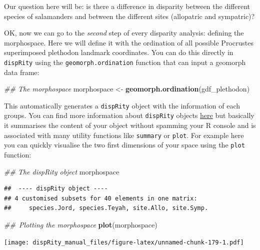 \documentclass[]{book}
\newenvironment{Shaded}{\begin{snugshade}}{\end{snugshade}}
\newcommand{\CommentTok}[1]{\textcolor[rgb]{0.56,0.35,0.01}{\textit{#1}}}
\newcommand{\KeywordTok}[1]{\textcolor[rgb]{0.13,0.29,0.53}{\textbf{#1}}}
\newcommand{\NormalTok}[1]{#1}
\newcommand{\StringTok}[1]{\textcolor[rgb]{0.31,0.60,0.02}{#1}}
\begin{document}
Our question here will be: is there a difference in disparity between the different species of salamanders and between the different sites (allopatric and sympatric)?

OK, now we can go to the \emph{second} step of every disparity analysis: defining the morphospace.
Here we will define it with the ordination of all possible Procrustes superimposed plethodon landmark coordinates.
You can do this directly in \texttt{dispRity} using the \texttt{geomorph.ordination} function that can input a geomorph data frame:

\begin{Shaded}
\begin{Highlighting}[]
\CommentTok{## The morphospace}
\NormalTok{morphospace <-}\StringTok{ }\KeywordTok{geomorph.ordination}\NormalTok{(gdf_plethodon)}
\end{Highlighting}
\end{Shaded}

This automatically generates a \texttt{dispRity} object with the information of each groups. You can find more information about \texttt{dispRity} objects \protect\hyperlink{disprity-object}{here} but basically it summarises the content of your object without spamming your R console and is associated with many utility functions like \texttt{summary} or \texttt{plot}. For example here you can quickly visualise the two first dimensions of your space using the \texttt{plot} function:

\begin{Shaded}
\begin{Highlighting}[]
\CommentTok{## The dispRity object}
\NormalTok{morphospace}
\end{Highlighting}
\end{Shaded}

\begin{verbatim}
##  ---- dispRity object ---- 
## 4 customised subsets for 40 elements in one matrix:
##     species.Jord, species.Teyah, site.Allo, site.Symp.
\end{verbatim}

\begin{Shaded}
\begin{Highlighting}[]
\CommentTok{## Plotting the morphospace}
\KeywordTok{plot}\NormalTok{(morphospace)}
\end{Highlighting}
\end{Shaded}

\texttt{[image: dispRity\_manual\_files/figure-latex/unnamed-chunk-179-1.pdf]}
\end{document}
